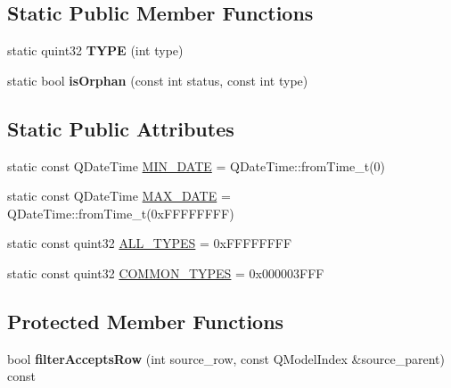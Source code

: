 \subsection*{Static Public Member Functions}
\begin{DoxyCompactItemize}
\item 
\mbox{\label{class_transaction_filter_proxy_aaacec79a6362b13ee4cfab7f770e33b5}} 
static quint32 {\bfseries T\+Y\+PE} (int type)
\item 
\mbox{\label{class_transaction_filter_proxy_abd49cc3982bb0d5e1f2a0dec38f4b0b2}} 
static bool {\bfseries is\+Orphan} (const int status, const int type)
\end{DoxyCompactItemize}
\subsection*{Static Public Attributes}
\begin{DoxyCompactItemize}
\item 
static const Q\+Date\+Time \mbox{\hyperlink{class_transaction_filter_proxy_aac7bf4c1105641b19eb6f7c8741b502e}{M\+I\+N\+\_\+\+D\+A\+TE}} = Q\+Date\+Time\+::from\+Time\+\_\+t(0)
\item 
static const Q\+Date\+Time \mbox{\hyperlink{class_transaction_filter_proxy_a5ac7f4d41a56e44f4cc74ebeffb5a254}{M\+A\+X\+\_\+\+D\+A\+TE}} = Q\+Date\+Time\+::from\+Time\+\_\+t(0x\+F\+F\+F\+F\+F\+F\+F\+F)
\item 
static const quint32 \mbox{\hyperlink{class_transaction_filter_proxy_a845c1358f6cc8e60b6fae4725d2fc03f}{A\+L\+L\+\_\+\+T\+Y\+P\+ES}} = 0x\+F\+F\+F\+F\+F\+F\+FF
\item 
static const quint32 \mbox{\hyperlink{class_transaction_filter_proxy_a2aa26410f537c1c81acbe477ab9b7b0d}{C\+O\+M\+M\+O\+N\+\_\+\+T\+Y\+P\+ES}} = 0x000003\+F\+FF
\end{DoxyCompactItemize}
\subsection*{Protected Member Functions}
\begin{DoxyCompactItemize}
\item 
\mbox{\label{class_transaction_filter_proxy_a6ab964123a0a3f2a28049a44153fce49}} 
bool {\bfseries filter\+Accepts\+Row} (int source\+\_\+row, const Q\+Model\+Index \&source\+\_\+parent) const
\end{DoxyCompactItemize}



